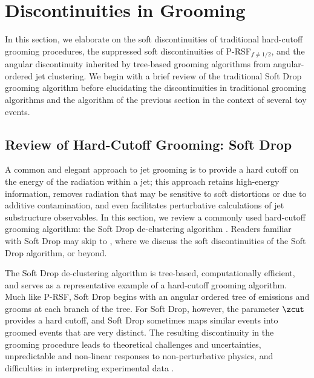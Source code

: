 \section{Discontinuities in Grooming}
\label{sec:traditionaldiscont}
In this section, we elaborate on the soft discontinuities of traditional hard-cutoff grooming procedures, the suppressed soft discontinuities of P-RSF\(_{f\neq 1/2}\), and the angular discontinuity inherited by tree-based grooming algorithms from angular-ordered jet clustering.
%
We begin with a brief review of the traditional Soft Drop grooming algorithm before elucidating the discontinuities in traditional grooming algorithms and the  algorithm of the previous section in the context of several toy events.

\subsection{Review of Hard-Cutoff Grooming: Soft Drop}
\label{sec:softdrop}
A common and elegant approach to jet grooming is to provide a hard cutoff on the energy of the radiation within a jet;
%
this approach retains high-energy information, removes radiation that may be sensitive to soft distortions or due to additive contamination, and even facilitates perturbative calculations of jet substructure observables.
%
In this section, we review a commonly used hard-cutoff grooming algorithm:
%
the Soft Drop de-clustering algorithm \cite{Larkoski:2014wba}.
%
Readers familiar with Soft Drop may skip to , where we discuss the soft discontinuities of the Soft Drop algorithm, or beyond.

The Soft Drop de-clustering algorithm is tree-based, computationally efficient, and serves as a representative example of a hard-cutoff grooming algorithm.
%
Much like P-RSF, Soft Drop begins with an angular ordered tree of emissions and grooms at each branch of the tree.
%
For Soft Drop, however, the parameter \(\zcut\) provides a hard cutoff, and Soft Drop sometimes maps similar events into groomed events that are very distinct.
%
The resulting discontinuity in the grooming procedure leads to theoretical challenges and uncertainties, unpredictable and non-linear responses to non-perturbative physics, and difficulties in interpreting experimental data \cite{ATL-PHYS-PUB-2019-027,Aad:2019vyi,ATLAS:2020gwe}.

